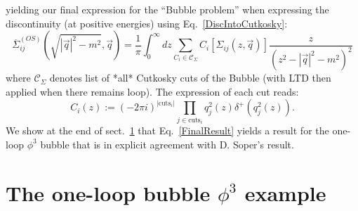 \documentclass[11pt]{article}
\begin{document}
yielding our final expression for the ``Bubble problem'' when expressing the discontinuity (at positive energies) using Eq.~\ref{DiscIntoCutkosky}:
\begin{equation}
\boxed{
\overline{\Sigma}_{ij}^{(OS)}(\sqrt{|\vec{q}|^2-m^2 }, \vec{q})=
\frac{ 1 }{\pi} \int_{0}^\infty d z \sum_{C_i \in \mathcal{C}_\Sigma} C_i\left[ \Sigma_{ij}(z, \vec{q})\right]  \frac{ z }{( z^2 - |\vec{q}|^2-m^2)^2 }
}\label{FinalResult}
\end{equation}
where $\mathcal{C}_\Sigma$ denotes list of *all* Cutkosky cuts of the Bubble (with LTD then applied when there remains loop). The expression of each cut reads:
\begin{equation}
C_i(z) := (-2\pi i)^{|\textrm{cuts}_i|} \prod_{j\in \textrm{cuts}_i} q_j^2(z) \delta^+\left(q_j^2(z)\right).
\end{equation}
We show at the end of sect.~\ref{BubbleExample} that Eq.~\ref{FinalResult}
yields a result for the one-loop $\phi^3$ bubble that is in explicit agreement with D. Soper's result.

\newpage
\section{The one-loop bubble $\phi^3$ example}
\label{BubbleExample}
\end{document}
